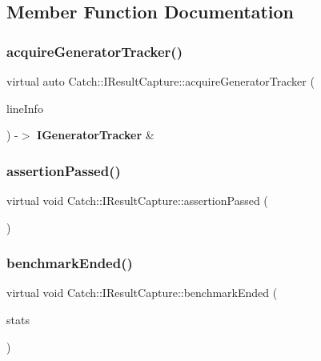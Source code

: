 \subsection{Member Function Documentation}
\mbox{\label{struct_catch_1_1_i_result_capture_ab020d111e29ad1cabe1227dcfda712ef}} 
\subsubsection{acquireGeneratorTracker()}
{\footnotesize\ttfamily virtual auto Catch\+::\+I\+Result\+Capture\+::acquire\+Generator\+Tracker (\begin{DoxyParamCaption}\item[{\textbf{ Source\+Line\+Info} const \&}]{line\+Info }\end{DoxyParamCaption}) -\/$>$  \textbf{ I\+Generator\+Tracker} \&\hspace{0.3cm}{\ttfamily [pure virtual]}}

\mbox{\label{struct_catch_1_1_i_result_capture_a9b0ef2cb071e9a9dc6ec1b533026aea7}} 
\subsubsection{assertionPassed()}
{\footnotesize\ttfamily virtual void Catch\+::\+I\+Result\+Capture\+::assertion\+Passed (\begin{DoxyParamCaption}{ }\end{DoxyParamCaption})\hspace{0.3cm}{\ttfamily [pure virtual]}}

\mbox{\label{struct_catch_1_1_i_result_capture_a6e5e64f9d94211a888249012ab6cc7fb}} 
\subsubsection{benchmarkEnded()}
{\footnotesize\ttfamily virtual void Catch\+::\+I\+Result\+Capture\+::benchmark\+Ended (\begin{DoxyParamCaption}\item[{Benchmark\+Stats const \&}]{stats }\end{DoxyParamCaption})\hspace{0.3cm}{\ttfamily [pure virtual]}}

